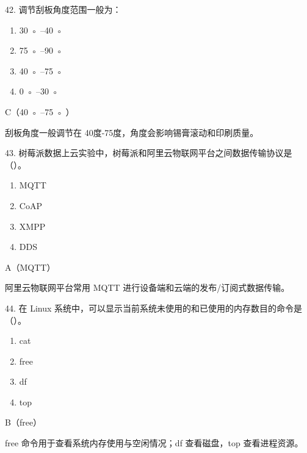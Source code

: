 \begin{question}{42. 调节刮板角度范围一般为：}
\begin{enumerate}[label=\Alph*., leftmargin=2.4em, itemsep=0.2em]
\item 30 ◦ –40 ◦
\item 75 ◦ –90 ◦
\item 40 ◦ –75 ◦
\item 0 ◦ –30 ◦
\end{enumerate}
\end{question}
\begin{answer}
C（40 ◦ –75 ◦ ）
\end{answer}
\begin{explanation}
刮板角度一般调节在 40度-75度，角度会影响锡膏滚动和印刷质量。
\end{explanation}

\begin{question}{43. 树莓派数据上云实验中，树莓派和阿里云物联网平台之间数据传输协议是（）。}
\begin{enumerate}[label=\Alph*., leftmargin=2.4em, itemsep=0.2em]
\item MQTT
\item CoAP
\item XMPP
\item DDS
\end{enumerate}
\end{question}
\begin{answer}
A（MQTT）
\end{answer}
\begin{explanation}
阿里云物联网平台常用 MQTT 进行设备端和云端的发布/订阅式数据传输。
\end{explanation}

\begin{question}{44. 在 Linux 系统中，可以显示当前系统未使用的和已使用的内存数目的命令是（）。}
\begin{enumerate}[label=\Alph*., leftmargin=2.4em, itemsep=0.2em]
\item cat
\item free
\item df
\item top
\end{enumerate}
\end{question}
\begin{answer}
B（free）
\end{answer}
\begin{explanation}
free 命令用于查看系统内存使用与空闲情况；df 查看磁盘，top 查看进程资源。
\end{explanation}

